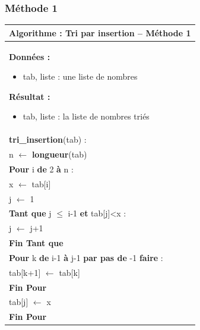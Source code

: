 \documentclass[10pt]{article}
\begin{document}
\subsubsection{Méthode 1}
\begin{minipage}[c]{.48\linewidth}
\begin{pseudo}
\begin{center}
\begin{tabular}{p{}}
\hline
\textbf{Algorithme :} Tri par insertion -- Méthode 1\\
\hline
\textbf{Données :}
\begin{itemize}
\item \textsf{tab}, liste : une liste de nombres
\end{itemize}
\textbf{Résultat :} 
\begin{itemize}
\item \textsf{tab}, liste : la liste de nombres triés
\end{itemize}
\\
\textbf{tri\_insertion}(\textsf{tab}) :\\
\hspace{.4cm} \textsf{n} $\leftarrow$ \textbf{longueur}(\textsf{tab}) \\
\hspace{.4cm}\textbf{Pour} \textsf{i} \textbf{de} 2 \textbf{à} \textsf{n} : \\
\hspace{.8cm} \textsf{x} $\leftarrow$ \textsf{tab[i]} \\
\hspace{.8cm} \textsf{j} $\leftarrow$ \textsf{1} \\
\hspace{.8cm}\textbf{Tant que} \textsf{j $\leq$ i-1} \textbf{et} \textsf{tab[j]<x}  : \\
\hspace{1.2cm} \textsf{j} $\leftarrow$ \textsf{j+1} \\
\hspace{.8cm}\textbf{Fin Tant que} \\
\hspace{.8cm}\textbf{Pour} \textsf{k} \textbf{de} \textsf{i-1} \textbf{à} \textsf{j-1} \textbf{par pas de} \textsf{-1} \textbf{faire} : \\
\hspace{1.2cm} \textsf{tab[k+1]} $\leftarrow$ \textsf{tab[k]} \\
\hspace{.8cm}\textbf{Fin Pour} \\
\hspace{.8cm} \textsf{tab[j]} $\leftarrow$ \textsf{x} \\
\hspace{.4cm}\textbf{Fin Pour} \\
\hline
\end{tabular}
\end{center}
\end{pseudo}
\end{minipage} \hfill
\end{document}

